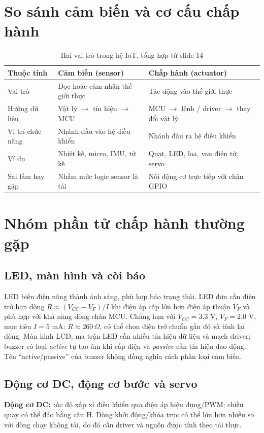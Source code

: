 \section{So sánh cảm biến và cơ cấu chấp hành}
\begin{table}[htbp]\centering\small
\caption{Hai vai trò trong hệ IoT, tổng hợp từ slide 14}
\begin{tabularx}{\textwidth}{p{34mm}XX}
\toprule
Thuộc tính & Cảm biến (sensor) & Chấp hành (actuator)\\\midrule
Vai trò & Đọc hoặc cảm nhận thế giới thực & Tác động vào thế giới thực\\
Hướng dữ liệu & Vật lý $\to$ tín hiệu $\to$ MCU & MCU $\to$ lệnh / driver $\to$ thay đổi vật lý\\
Vị trí chức năng & Nhánh đầu vào hệ điều khiển & Nhánh đầu ra hệ điều khiển\\
Ví dụ & Nhiệt kế, micro, IMU, từ kế & Quạt, LED, loa, van điện từ, servo\\
Sai lầm hay gặp & Nhầm mức logic sensor là tải & Nối động cơ trực tiếp với chân GPIO\\\bottomrule
\end{tabularx}
\end{table}

\section{Nhóm phần tử chấp hành thường gặp}
\subsection{LED, màn hình và còi báo}
LED biến điện năng thành ánh sáng, phù hợp báo trạng thái. LED đơn cần điện trở hạn dòng $R\approx (V_{CC}-V_F)/I$ khi điện áp cấp lớn hơn điện áp thuận $V_F$ và phù hợp với khả năng dòng chân MCU. Chẳng hạn với $V_{CC}=3.3$ V, $V_F=2.0$ V, mục tiêu $I=5$ mA: $R\approx260\,\Omega$, có thể chọn điện trở chuẩn gần đó và tính lại dòng. Màn hình LCD, ma trận LED cần nhiều tín hiệu dữ liệu và mạch driver; buzzer có loại \emph{active} tự tạo âm khi cấp điện và \emph{passive} cần tín hiệu dao động. Tên ``active/passive'' của buzzer không đồng nghĩa cách phân loại cảm biến.

\subsection{Động cơ DC, động cơ bước và servo}
\textbf{Động cơ DC:} tốc độ xấp xỉ điều khiển qua điện áp hiệu dụng/PWM; chiều quay có thể đảo bằng cầu H. Dòng khởi động/khóa trục có thể lớn hơn nhiều so với dòng chạy không tải, do đó cần driver và nguồn được tính theo tải thực.

